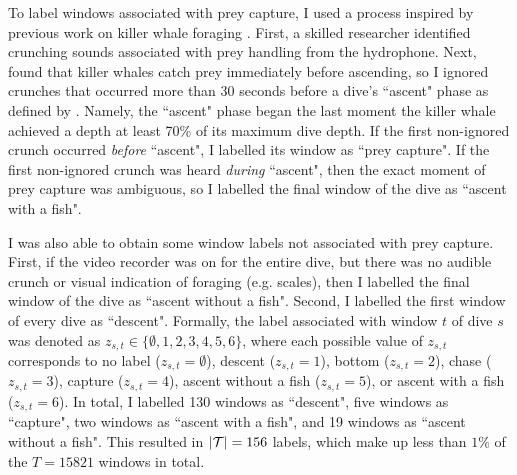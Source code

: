 To label windows associated with prey capture, I used a process inspired by previous work on killer whale foraging \citep{Wright:2017, Tennessen:2019a}. First, a skilled researcher identified crunching sounds associated with prey handling from the hydrophone.
%
Next, \citet{Wright:2017} found that killer whales catch prey immediately before ascending, so I ignored crunches that occurred more than 30 seconds before a dive's ``ascent" phase as defined by \citet{Tennessen:2019a}. Namely, the ``ascent" phase began the last moment the killer whale achieved a depth at least 70\% of its maximum dive depth. If the first non-ignored crunch occurred \textit{before} ``ascent", I labelled its window as ``prey capture". If the first non-ignored crunch was heard \textit{during} ``ascent", then the exact moment of prey capture was ambiguous, so I labelled the final window of the dive as ``ascent with a fish". 

I was also able to obtain some window labels not associated with prey capture. First, if the video recorder was on for the entire dive, but there was no audible crunch or visual indication of foraging (e.g. scales), then I labelled the final window of the dive as ``ascent without a fish". Second, I labelled the first window of every dive as ``descent". Formally, the label associated with window $t$ of dive $s$ was denoted as $z_{s,t} \in \{\emptyset,1,2,3,4,5,6\}$, where each possible value of $z_{s,t}$ corresponds to no label ($z_{s,t} = \emptyset$), descent ($z_{s,t} = 1$), bottom ($z_{s,t} = 2$), chase ($z_{s,t} = 3$), capture ($z_{s,t} = 4$), ascent without a fish ($z_{s,t} = 5$), or ascent with a fish ($z_{s,t} = 6$). In total, I labelled 130 windows as ``descent", five windows as ``capture", two windows as ``ascent with a fish", and 19 windows as ``ascent without a fish". This resulted in $|\mathcal{T}| = 156$ labels, which make up less than $1\%$ of the $T = 15821$ windows in total.

